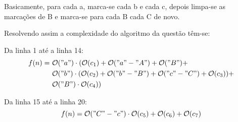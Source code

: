 \documentclass{article}
\begin{document}
Basicamente, para cada a, marca-se cada b e cada c, depois limpa-se as
marcações de B e marca-se para cada B cada C de novo.

Resolvendo assim a complexidade do algoritmo da questão têm-se:

Da linha 1 até a linha 14:
\begin{align}
  \begin{split}
    f(n) =\ &{}       \mathcal{O}("a") \cdot (\mathcal{O}(c_1) + \mathcal{O}("a"-"A") + \mathcal{O}("B") + \\
                     &\mathcal{O}("b") \cdot (\mathcal{O}(c_2) + \mathcal{O}("b"-"B") + \mathcal{O}("c"-"C") + \mathcal{O}(c_3)) + \\
                     &\mathcal{O}("B") \cdot \mathcal{O}(c_4)) \\
\end{split}
\end{align}

Da linha 15 até a linha 20:
$$f(n) = \mathcal{O}("C"-"c") \cdot \mathcal{O}(c_5) + \mathcal{O}(c_6) + \mathcal{O}(c_7)$$
\end{document}
